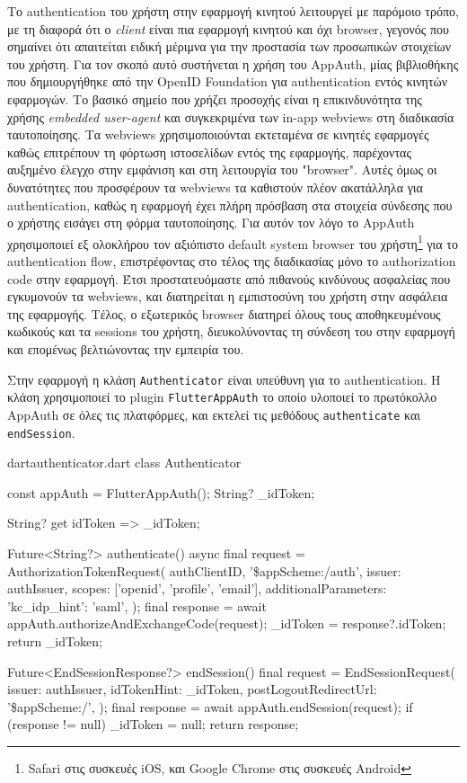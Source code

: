 \documentclass[../thesis.tex]{subfiles}
\begin{document}
Το authentication του χρήστη στην εφαρμογή κινητού λειτουργεί με παρόμοιο τρόπο, με τη διαφορά ότι ο \textit{client} είναι πια εφαρμογή κινητού και όχι browser, γεγονός που σημαίνει ότι απαιτείται ειδική μέριμνα για την προστασία των προσωπικών στοιχείων του χρήστη.
Για τον σκοπό αυτό συστήνεται η χρήση του AppAuth, μίας βιβλιοθήκης που δημιουργήθηκε από την OpenID Foundation για authentication εντός κινητών εφαρμογών.
Το βασικό σημείο που χρήζει προσοχής είναι η επικινδυνότητα της χρήσης \textit{embedded user-agent} και συγκεκριμένα των in-app webviews στη διαδικασία ταυτοποίησης.
Τα webviews χρησιμοποιούνται εκτεταμένα σε κινητές εφαρμογές καθώς επιτρέπουν τη φόρτωση ιστοσελίδων εντός της εφαρμογής, παρέχοντας αυξημένο έλεγχο στην εμφάνιση και στη λειτουργία του "browser".
Αυτές όμως οι δυνατότητες που προσφέρουν τα webviews τα καθιστούν πλέον ακατάλληλα για authentication, καθώς η εφαρμογή έχει πλήρη πρόσβαση στα στοιχεία σύνδεσης που ο χρήστης εισάγει στη φόρμα ταυτοποίησης.\cite[\S8.12]{rfc8252}
Για αυτόν τον λόγο το AppAuth χρησιμοποιεί εξ ολοκλήρου τον αξιόπιστο default system browser του χρήστη\footnote{Safari στις συσκευές iOS, και Google Chrome στις συσκευές Android} για το authentication flow, επιστρέφοντας στο τέλος της διαδικασίας μόνο το authorization code στην εφαρμογή.
Έτσι προστατευόμαστε από πιθανούς κινδύνους ασφαλείας που εγκυμονούν τα webviews, και διατηρείται η εμπιστοσύνη του χρήστη στην ασφάλεια της εφαρμογής.
Τέλος, ο εξωτερικός browser διατηρεί όλους τους αποθηκευμένους κωδικούς και τα sessions του χρήστη, διευκολύνοντας τη σύνδεση του στην εφαρμογή και επομένως βελτιώνοντας την εμπειρία του.

Στην εφαρμογή η κλάση \texttt{Authenticator} είναι υπεύθυνη για το authentication.
Η κλάση χρησιμοποιεί το plugin \texttt{FlutterAppAuth} το οποίο υλοποιεί το πρωτόκολλο AppAuth σε όλες τις πλατφόρμες, και εκτελεί τις μεθόδους \texttt{authenticate} και \texttt{endSession}.

\begin{codeblock}{dart}{authenticator.dart}
  class Authenticator {
    const appAuth = FlutterAppAuth();
    String? _idToken;

    String? get idToken => _idToken;
  
    Future<String?> authenticate() async {
      final request = AuthorizationTokenRequest(
        authClientID,
        '\$appScheme:/auth',
        issuer: authIssuer,
        scopes: ['openid', 'profile', 'email'],
        additionalParameters: {'kc_idp_hint': 'saml'},
      );
      final response = await appAuth.authorizeAndExchangeCode(request);
      _idToken = response?.idToken;
      return _idToken;
    }
  
    Future<EndSessionResponse?> endSession() {
      final request = EndSessionRequest(
        issuer: authIssuer,
        idTokenHint: _idToken,
        postLogoutRedirectUrl: '\$appScheme:/',
      );
      final response = await appAuth.endSession(request);
      if (response != null) _idToken = null;
      return response;
    }
  }  
\end{codeblock}
\end{document}
